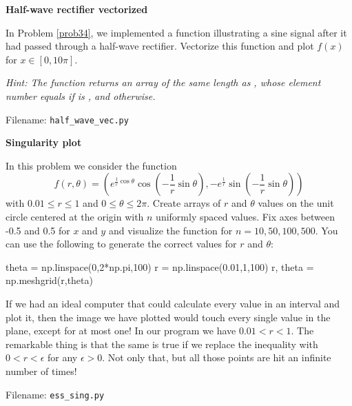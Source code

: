 \begin{Problem}{\textbf{Half-wave rectifier vectorized}}

\noindent In Problem \ref{prob34}, we implemented a function illustrating a sine signal after it
had passed through a half-wave rectifier. Vectorize this function and plot $f(x)$
for $x \in [0, 10\pi]$.

\emph{Hint: The  function returns an
array of the same length as , whose element number
 equals  if  is ,
and  otherwise.}

Filename: \texttt{half\_wave\_vec.py}
\end{Problem}


\begin{Problem}{\textbf{Singularity plot}}

\noindent In this problem we consider the function
\begin{equation*}
    f(r,\theta)=\left(e^{\frac{1}{r}\cos{\theta}}\cos\left(-\frac{1}{r}\sin{\theta}\right),
    			-e^{\frac{1}{r}} \sin\left(-\frac{1}{r}\sin{\theta}\right)\right)
\end{equation*}
with $0.01\leq r \leq 1$ and $0\leq \theta \leq 2\pi$. Create arrays of $r$ and
$\theta$ values on the unit circle centered at the origin with $n$ uniformly
spaced values. Fix axes between
-0.5 and 0.5 for $x$ and $y$ and visualize the function for $n=10,50,100,500$.
You can use the following to generate the correct values for $r$ and $\theta$:
\begin{python}
theta = np.linspace(0,2*np.pi,100)
r = np.linspace(0.01,1,100)
r, theta = np.meshgrid(r,theta)
\end{python}

\begin{remark}
If we had an ideal computer that could calculate every value in an interval and
plot it, then the image we have plotted would touch every single value in the
plane, except for at most one! In our program we have $0.01<r<1$. The remarkable
thing is that the same is true if we replace the inequality with $0<r<\epsilon$
for any $\epsilon > 0$. Not only that, but all those points are hit an infinite
number of times!
\end{remark}

Filename: \texttt{ess\_sing.py}
\end{Problem}

